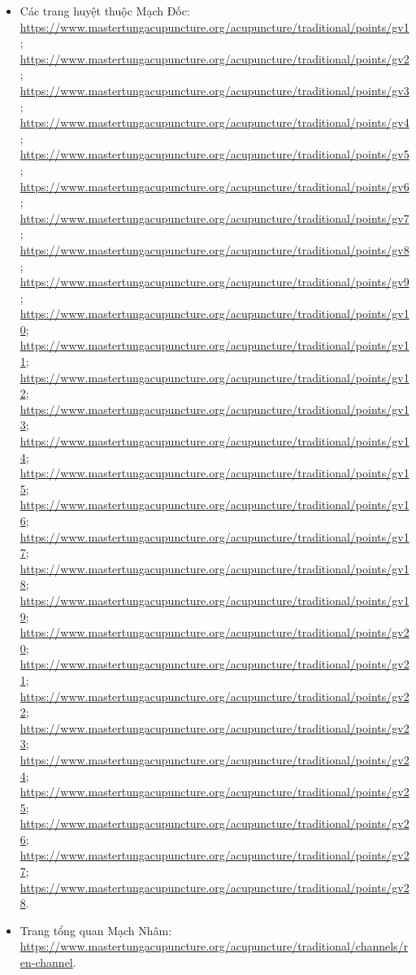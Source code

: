 \documentclass[12pt,a4paper]{article}
\begin{document}
\begin{itemize}
  \item Các trang huyệt thuộc Mạch Đốc: \url{https://www.mastertungacupuncture.org/acupuncture/traditional/points/gv1}; \url{https://www.mastertungacupuncture.org/acupuncture/traditional/points/gv2}; \url{https://www.mastertungacupuncture.org/acupuncture/traditional/points/gv3}; \url{https://www.mastertungacupuncture.org/acupuncture/traditional/points/gv4}; \url{https://www.mastertungacupuncture.org/acupuncture/traditional/points/gv5}; \url{https://www.mastertungacupuncture.org/acupuncture/traditional/points/gv6}; \url{https://www.mastertungacupuncture.org/acupuncture/traditional/points/gv7}; \url{https://www.mastertungacupuncture.org/acupuncture/traditional/points/gv8}; \url{https://www.mastertungacupuncture.org/acupuncture/traditional/points/gv9}; \url{https://www.mastertungacupuncture.org/acupuncture/traditional/points/gv10}; \url{https://www.mastertungacupuncture.org/acupuncture/traditional/points/gv11}; \url{https://www.mastertungacupuncture.org/acupuncture/traditional/points/gv12}; \url{https://www.mastertungacupuncture.org/acupuncture/traditional/points/gv13}; \url{https://www.mastertungacupuncture.org/acupuncture/traditional/points/gv14}; \url{https://www.mastertungacupuncture.org/acupuncture/traditional/points/gv15}; \url{https://www.mastertungacupuncture.org/acupuncture/traditional/points/gv16}; \url{https://www.mastertungacupuncture.org/acupuncture/traditional/points/gv17}; \url{https://www.mastertungacupuncture.org/acupuncture/traditional/points/gv18}; \url{https://www.mastertungacupuncture.org/acupuncture/traditional/points/gv19}; \url{https://www.mastertungacupuncture.org/acupuncture/traditional/points/gv20}; \url{https://www.mastertungacupuncture.org/acupuncture/traditional/points/gv21}; \url{https://www.mastertungacupuncture.org/acupuncture/traditional/points/gv22}; \url{https://www.mastertungacupuncture.org/acupuncture/traditional/points/gv23}; \url{https://www.mastertungacupuncture.org/acupuncture/traditional/points/gv24}; \url{https://www.mastertungacupuncture.org/acupuncture/traditional/points/gv25}; \url{https://www.mastertungacupuncture.org/acupuncture/traditional/points/gv26}; \url{https://www.mastertungacupuncture.org/acupuncture/traditional/points/gv27}; \url{https://www.mastertungacupuncture.org/acupuncture/traditional/points/gv28}.
  \item Trang tổng quan Mạch Nhâm: \url{https://www.mastertungacupuncture.org/acupuncture/traditional/channels/ren-channel}.

\end{itemize}
\end{document}
